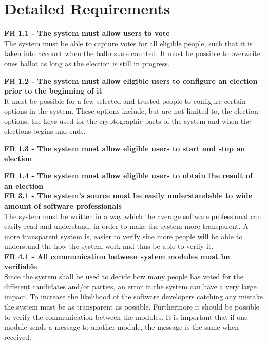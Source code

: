 \chapter{Detailed Requirements}

\textbf{FR 1.1 - The system must allow users to vote} \\
The system must be able to capture votes for all eligible people, such that it is taken into account when the ballots are counted. It must be possible to overwrite ones ballot as long as the election is still in progress.

\textbf{FR 1.2 - The system must allow eligible users to configure an election prior to the beginning of it} \\
It must be possible for a few selected and trusted people to configure certain options in the system. These options include, but are not limited to, the election options, the keys used for the cryptographic parts of the system and when the elections begins and ends.

\textbf{FR 1.3 - The system must allow eligible users to start and stop an election}

\textbf{FR 1.4 - The system must allow eligible users to obtain the result of an election} \\

\textbf{FR 3.1 - The system's source must be easily understandable to wide amount of software professionals} \\
The system must be written in a way which the average software professional can easily read and understand, in order to make the system more transparent. A more transparent system is, easier to verify sine more people will be able to understand the how the system work and thus be able to verify it. \\


\textbf{FR 4.1 - All communication between system modules must be verifiable} \\
Since the system shall be used to decide how many people has voted for the different candidates and/or parties, an error in the system can have a very large impact. To increase the likelihood of the software developers catching any mistake the system must be as transparent as possible. Furthermore it should be possible to verify the communication between the modules. It is important that if one module sends a message to another module, the message is the same when received.